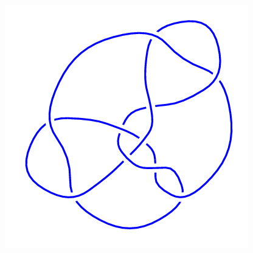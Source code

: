 \begin{figure}[H]
\begin{minipage}[b]{.18\linewidth}
	\end{minipage}
	\begin{minipage}[b]{.18\linewidth}
		\centering
		\includegraphics[width=\linewidth]{../data/10_161.png}
	\end{minipage}
\end{figure}
